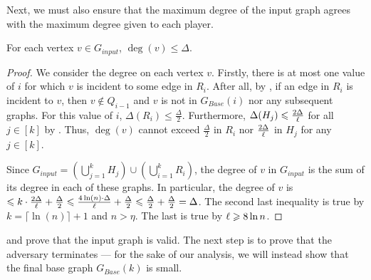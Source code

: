 \documentclass[11pt]{article}
\begin{document}
Next, we must also ensure that the maximum degree of the input graph agrees with the maximum degree given to each player. 
\begin{lemma}\label{valid-graph}
For each vertex $v\in G_{input}$, $\deg{(v)}\le \Delta$.
\end{lemma}
\begin{proof}
We consider the degree on each vertex $v$. Firstly, there is at most one value of $i$ for which $v$ is incident to some edge in $R_i$. After all, by , if an edge in $R_i$ is incident to $v$, then $v\not\in Q_{i-1}$ and $v$ is not in $G_{Base}(i)$ nor any subsequent graphs. For this value of $i$, $\Delta(R_i)\le \frac{\Delta}2$. Furthermore, $\Delta(H_j)\leqslant \frac{2\Delta}{\ell}$ for all $j\in [k]$ by . Thus, $\deg(v)$ cannot exceed $\frac{\Delta}2$ in $R_i$ nor $\frac{2\Delta}{\ell}$ in $H_j$ for any $j\in [k]$. 

Since $G_{input}=\left(\bigcup_{j=1}^k H_j\right)\cup\left(\bigcup_{i=1}^k R_i\right)$, the degree of $v$ in $G_{input}$ is the sum of its degree in each of these graphs. In particular, the degree of $v$ is $\leqslant k\cdot \frac{2\Delta}{\ell}+\frac{\Delta}2\leqslant \frac{4\ln(n)\cdot\Delta}{\ell}+\frac{\Delta}2\leqslant\frac{\Delta}2+\frac{\Delta}2=\Delta$. The second last inequality is true by $k=\lceil \ln(n)\rceil+1$ and $n>\eta$. The last is true by ${\ell}\geqslant 8\ln n$. 
\end{proof}

 and  prove that the input graph is valid. The next step is to prove that the adversary terminates --- for the sake of our analysis, we will instead show that the final base graph $G_{Base}(k)$ is small. 
\end{document}
